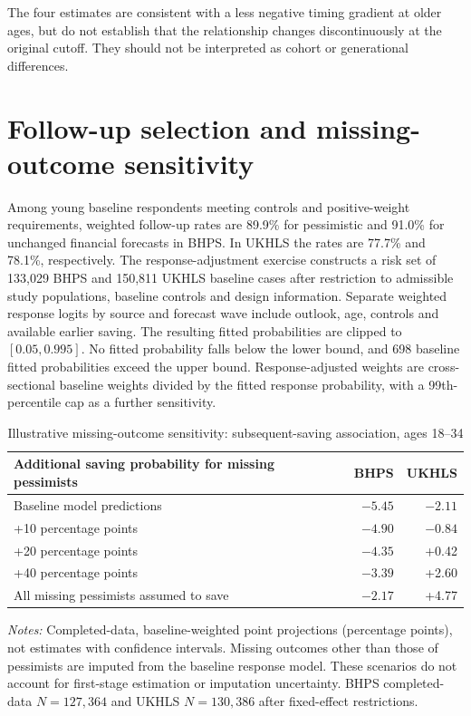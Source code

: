 The four estimates are consistent with a less negative timing gradient at older ages, but do not establish that the relationship changes discontinuously at the original cutoff. They should not be interpreted as cohort or generational differences.

\section{Follow-up selection and missing-outcome sensitivity}\label{sec:missing}

Among young baseline respondents meeting controls and positive-weight requirements, weighted follow-up rates are 89.9\% for pessimistic and 91.0\% for unchanged financial forecasts in BHPS. In UKHLS the rates are 77.7\% and 78.1\%, respectively. The response-adjustment exercise constructs a risk set of 133,029 BHPS and 150,811 UKHLS baseline cases after restriction to admissible study populations, baseline controls and design information. Separate weighted response logits by source and forecast wave include outlook, age, controls and available earlier saving. The resulting fitted probabilities are clipped to $[0.05,0.995]$. No fitted probability falls below the lower bound, and 698 baseline fitted probabilities exceed the upper bound. Response-adjusted weights are cross-sectional baseline weights divided by the fitted response probability, with a 99th-percentile cap as a further sensitivity.

\begin{table}[!htbp]
\centering
\caption{Illustrative missing-outcome sensitivity: subsequent-saving association, ages 18--34}
\label{tab:missing}
\begin{threeparttable}
\small
\begin{tabular}{@{}lrr@{}}
\toprule
Additional saving probability for missing pessimists & BHPS & UKHLS\\
\midrule
Baseline model predictions & $-5.45$ & $-2.11$\\
+10 percentage points & $-4.90$ & $-0.84$\\
+20 percentage points & $-4.35$ & +0.42\\
+40 percentage points & $-3.39$ & +2.60\\
All missing pessimists assumed to save & $-2.17$ & +4.77\\
\bottomrule
\end{tabular}
\begin{tablenotes}[flushleft]\footnotesize
\item \textit{Notes:} Completed-data, baseline-weighted point projections (percentage points), not estimates with confidence intervals. Missing outcomes other than those of pessimists are imputed from the baseline response model. These scenarios do not account for first-stage estimation or imputation uncertainty. BHPS completed-data $N=127{,}364$ and UKHLS $N=130{,}386$ after fixed-effect restrictions.
\end{tablenotes}
\end{threeparttable}
\end{table}
\FloatBarrier

